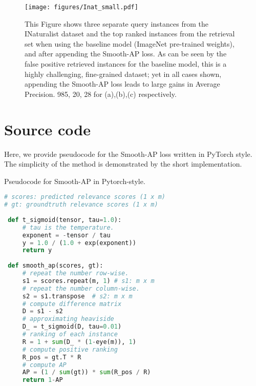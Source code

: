 \documentclass[runningheads]{llncs}
\newcommand\beforecaptions{\vspace{-3mm}}
\newcommand\aftercaptions{\vspace{-5mm}}
\begin{document}
\begin{figure}[htp]
\begin{center}
   \texttt{[image: figures/Inat\_small.pdf]}
\end{center}
\vspace{-10pt}
\beforecaptions
   \caption{\small{This Figure shows three separate query instances from the INaturalist dataset and the top ranked instances from the retrieval set when using the baseline model (ImageNet pre-trained weights), and after appending the Smooth-AP loss. As can be seen by the false positive retrieved instances for the baseline model, this is a highly challenging, fine-grained dataset; yet in all cases shown, appending the Smooth-AP loss leads to large gains in Average Precision.  985, 20, 28 for (a),(b),(c) respectively.}}
 \aftercaptions
 \vspace{-1mm}
 \label{Inat}
\end{figure}


 \label{sec:qual_results}
\newpage

\section{Source code}
Here, we provide pseudocode for the Smooth-AP loss written in PyTorch style. 
The simplicity of the method is demonstrated by the short implementation. 

\newcommand\algcomment[1]{\def\@algcomment{\footnotesize#1}}
\begin{algorithm}[h]
	\caption{Pseudocode for Smooth-AP in Pytorch-style.}\label{fig:algo}
	\begin{lstlisting}[language=python]
# scores: predicted relevance scores (1 x m)
# gt: groundtruth relevance scores (1 x m)
 
 def t_sigmoid(tensor, tau=1.0):
     # tau is the temperature.
     exponent = -tensor / tau
     y = 1.0 / (1.0 + exp(exponent))
     return y
 
 def smooth_ap(scores, gt):
     # repeat the number row-wise.
     s1 = scores.repeat(m, 1) # s1: m x m
     # repeat the number column-wise.
     s2 = s1.transpose  # s2: m x m
     # compute difference matrix
     D = s1 - s2
     # approximating heaviside
     D_ = t_sigmoid(D, tau=0.01)
     # ranking of each instance
     R = 1 + sum(D_ * (1-eye(m)), 1)
     # compute positive ranking
     R_pos = gt.T * R
     # compute AP
     AP = (1 / sum(gt)) * sum(R_pos / R)
     return 1-AP
	\end{lstlisting}
\end{algorithm}
\end{document}
